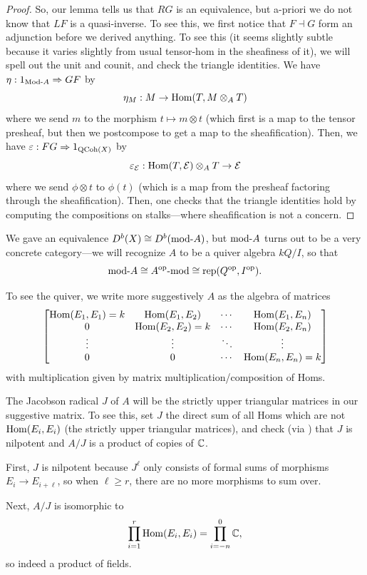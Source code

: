 \documentclass[12pt]{article}
\begin{document}
\begin{proof}
    So, our lemma tells us that $RG$ is an equivalence, but a-priori we do not know that $LF$ is a quasi-inverse. To see this, we first notice that $F\dashv G$ form an adjunction before we derived anything. To see this (it seems slightly subtle because it varies slightly from usual tensor-hom in the sheafiness of it), we will spell out the unit and counit, and check the triangle identities. We have $\eta: 1_{\mathrm{Mod}\text{-} A} \Rightarrow GF$ by
    \[\eta_M: M \to \mathrm{Hom}(T,M\otimes_A T)\]
    where we send $m$ to the morphism $t\mapsto m\otimes t$ (which first is a map to the tensor presheaf, but then we postcompose to get a map to the sheafification). Then, we have $\varepsilon: FG \Rightarrow 1_{\mathrm{QCoh}(X)}$ by
    \[\varepsilon_{\mathcal{E}}: \mathrm{Hom}(T,\mathcal{E}) \otimes_A T \to \mathcal{E}\]
    where we send $\phi \otimes t$ to $\phi(t)$ (which is a map from the presheaf factoring through the sheafification). Then, one checks that the triangle identities hold by computing the compositions on stalks---where sheafification is not a concern.
\end{proof}

We gave an equivalence $D^b(X) \cong D^b(\mathrm{mod}\text{-} A)$, but $\mathrm{mod}\text{-} A$ turns out to be a very concrete category---we will recognize $A$ to be a quiver algebra $kQ/I$, so that
\[\mathrm{mod}\text{-} A \cong A^{\mathrm{op}} \text{-}\mathrm{mod} \cong \mathrm{rep}(Q^{\mathrm{op}},I^{\mathrm{op}}).\]

To see the quiver, we write more suggestively $A$ as the algebra of matrices
\[\begin{bmatrix}
    \mathrm{Hom}(E_1,E_1)=k & \mathrm{Hom}(E_1,E_2) & \cdots & \mathrm{Hom}(E_1,E_n)\\
    0 & \mathrm{Hom}(E_2,E_2)=k & \cdots & \mathrm{Hom}(E_2,E_n)\\
    \vdots & \vdots & \ddots & \vdots\\
    0 & 0 & \cdots & \mathrm{Hom}(E_n,E_n)=k
\end{bmatrix}\]
with multiplication given by matrix multiplication/composition of Homs.

The Jacobson radical $J$ of $A$ will be the strictly upper triangular matrices in our suggestive matrix. To see this, set $J$ the direct sum of all Homs which are not $\mathrm{Hom}(E_i,E_i)$ (the strictly upper triangular matrices), and check (via \cite[I.1.4]{quiver}) that $J$ is nilpotent and $A/J$ is a product of copies of $\mathbb{C}$.

First, $J$ is nilpotent because $J^\ell$ only consists of formal sums of morphisms $E_i\to E_{i+\ell}$, so when $\ell\geq r$, there are no more morphisms to sum over.

Next, $A/J$ is isomorphic to
\[\prod_{i=1}^r \mathrm{Hom}(E_i,E_i) = \prod_{i=-n}^0 \mathbb{C},\]
so indeed a product of fields.
\end{document}
